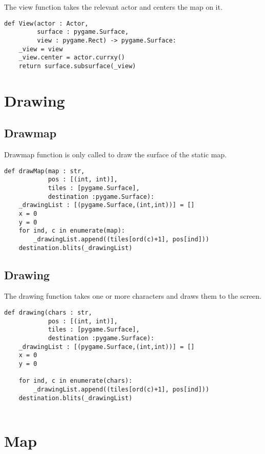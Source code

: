 \documentclass[11pt]{article}
\begin{document}
The view function takes the relevant actor and centers the map on it.

\begin{verbatim}
def View(actor : Actor,
         surface : pygame.Surface,
         view : pygame.Rect) -> pygame.Surface:
    _view = view
    _view.center = actor.currxy()
    return surface.subsurface(_view)
\end{verbatim}


\section{Drawing}
\label{sec:org3060db8}

\subsection{Drawmap}
\label{sec:orgf37f990}
Drawmap function is only called to draw the surface of the static map.

\begin{verbatim}
def drawMap(map : str,
            pos : [(int, int)],
            tiles : [pygame.Surface],
            destination :pygame.Surface):
    _drawingList : [(pygame.Surface,(int,int))] = []
    x = 0
    y = 0
    for ind, c in enumerate(map):
        _drawingList.append((tiles[ord(c)+1], pos[ind]))
    destination.blits(_drawingList)
\end{verbatim}

\subsection{Drawing}
\label{sec:org377e17e}
The drawing function takes one or more characters and draws them to the screen.

\begin{verbatim}
def drawing(chars : str,
            pos : [(int, int)],
            tiles : [pygame.Surface],
            destination :pygame.Surface):
    _drawingList : [(pygame.Surface,(int,int))] = []
    x = 0
    y = 0

    for ind, c in enumerate(chars):
        _drawingList.append((tiles[ord(c)+1], pos[ind]))
    destination.blits(_drawingList)


\end{verbatim}


\section{Map}
\label{sec:orgb1f452d}
\end{document}
